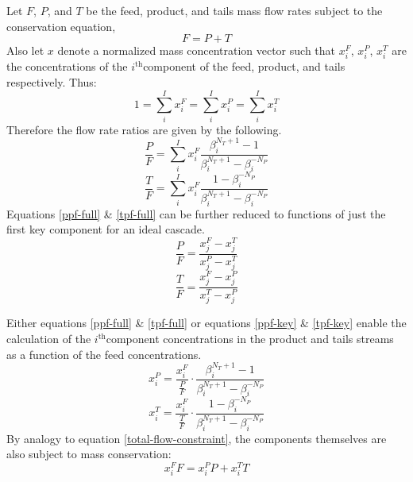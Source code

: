 \documentclass[preprint,12pt]{elsarticle}
\newcommand{\superscript}[1]{\ensuremath{^{\textrm{#1}}}}
\newcommand{\ith}[0]{$i$\superscript{th}}
\begin{document}
Let $F$, $P$, and $T$ be the feed, product, and tails mass flow rates subject to 
the conservation equation,
\begin{equation}
F = P + T
\label{total-flow-constraint}
\end{equation}
Also let $x$ denote a normalized mass concentration vector such that $x_i^F$, 
$x_i^P$, $x_i^T$ are the concentrations of the \ith component of the feed, product,
and tails respectively.  Thus:
\begin{equation}
1 = \sum_i^I x_i^F = \sum_i^I x_i^P = \sum_i^I x_i^T 
\end{equation}
Therefore the flow rate ratios are given by the following.
\begin{equation}
\frac{P}{F} = \sum_i^I x_i^F\frac{\beta_i^{N_T+1} - 1}
                                 {\beta_i^{N_T+1} - \beta_i^{-N_P}}
\label{ppf-full}
\end{equation}
\begin{equation}
\frac{T}{F} = \sum_i^I x_i^F\frac{1 - \beta_i^{-N_P}}
                                 {\beta_i^{N_T+1} - \beta_i^{-N_P}}
\label{tpf-full}
\end{equation}
Equations \ref{ppf-full} \&  \ref{tpf-full} can be further reduced to functions
of just the first key component for an ideal cascade.
\begin{equation}
\frac{P}{F} = \frac{x_j^F - x_j^T}{x_j^P - x_j^T}
\label{ppf-key}
\end{equation}
\begin{equation}
\frac{T}{F} = \frac{x_j^F - x_j^P}{x_j^T - x_j^P}
\label{tpf-key}
\end{equation}

Either equations \ref{ppf-full} \& \ref{tpf-full} or equations \ref{ppf-key} \& 
\ref{tpf-key} enable the calculation of the \ith component concentrations in the 
product and tails streams as a function of the feed concentrations.
\begin{equation}
x_i^P = \frac{x_i^F}{\frac{P}{F}}\cdot\frac{\beta_i^{N_T+1} - 1}
                                           {\beta_i^{N_T+1} - \beta_i^{-N_P}}
\label{prod-concentration}
\end{equation}
\begin{equation}
x_i^T = \frac{x_i^F}{\frac{T}{F}}\cdot\frac{1 - \beta_i^{-N_P}}
                                           {\beta_i^{N_T+1} - \beta_i^{-N_P}}
\label{tail-concentration}
\end{equation}
By analogy to equation \ref{total-flow-constraint}, the components themselves are
also subject to mass conservation:
\begin{equation}
x_i^FF = x_i^PP + x_i^TT
\label{comp-flow-constraint}
\end{equation}
\end{document}
